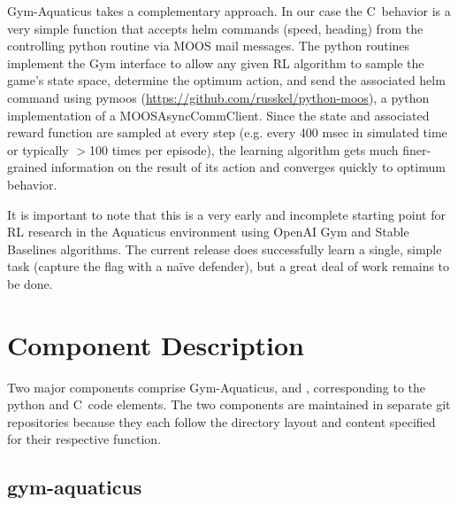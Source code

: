 \documentclass[onecolumn,letterpaper,11pt]{article}
\newcommand{\Cpp}{C\nolinebreak\hspace{-.05em}\raisebox{.4ex}{\tiny\bf +}\nolinebreak\hspace{-.10em}\raisebox{.4ex}{\tiny\bf +}}
\begin{document}
Gym-Aquaticus takes a complementary approach. In our case the \Cpp\ 
behavior is a very simple function that accepts helm commands (speed,
heading) from the controlling python routine via MOOS mail
messages. The python routines implement the Gym interface to allow any
given RL algorithm to sample the game's state space, determine the
optimum action, and send the associated helm command using pymoos
(\url{https://github.com/russkel/python-moos}), a python
implementation of a MOOSAsyncCommClient. Since the state and
associated reward function are sampled at every step (e.g. every
400 msec in simulated time or typically $>$100 times per episode), the
learning algorithm gets much finer-grained information on the result
of its action and converges quickly to optimum behavior.

It is important to note that this is a very early and incomplete
starting point for RL research in the Aquaticus environment using
OpenAI Gym and Stable Baselines algorithms. The current release does
successfully learn a single, simple task (capture the flag with a
na\"ive defender), but a great deal of work remains to be done.

\section{Component Description}

Two major components comprise Gym-Aquaticus,  and
\var{moos-ivp-rlagent}, corresponding to the python and \Cpp\
code elements. The two components are maintained in separate git
repositories because they each follow the directory layout and content
specified for their respective function.

\subsection{gym-aquaticus}
\end{document}
